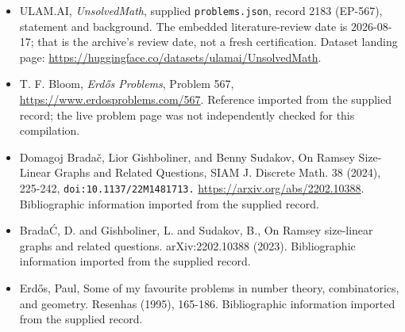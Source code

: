 \documentclass[11pt,a4paper]{article}
\begin{document}
{\small

\begin{itemize}

\item[\hypertarget{source:2183:1}{S1}] ULAM.AI, \emph{UnsolvedMath}, supplied \texttt{problems.json}, record 2183 (EP-567), statement and background. The embedded literature-review date is 2026-08-17; that is the archive’s review date, not a fresh certification. Dataset landing page: \url{https://huggingface.co/datasets/ulamai/UnsolvedMath}.

\item[\hypertarget{source:2183:2}{S2}] T. F. Bloom, \emph{Erdős Problems}, Problem 567, \url{https://www.erdosproblems.com/567}. Reference imported from the supplied record; the live problem page was not independently checked for this compilation.

\item[\hypertarget{source:2183:3}{S3}] Domagoj Bradač, Lior Gishboliner, and Benny Sudakov, On Ramsey Size-Linear Graphs and Related Questions, SIAM J. Discrete Math. 38 (2024), 225-242, \nolinkurl{doi:10.1137/22M1481713.} \url{https://arxiv.org/abs/2202.10388}. Bibliographic information imported from the supplied record.

\item[\hypertarget{source:2183:4}{S4}] Brada\'C, D. and Gishboliner, L. and Sudakov, B., On Ramsey size-linear graphs and related questions. arXiv:2202.10388 (2023). Bibliographic information imported from the supplied record.

\item[\hypertarget{source:2183:5}{S5}] Erd\H{o}s, Paul, Some of my favourite problems in number theory, combinatorics, and geometry. Resenhas (1995), 165-186. Bibliographic information imported from the supplied record.

\end{itemize}

}

\label{end:2183}
\end{document}
